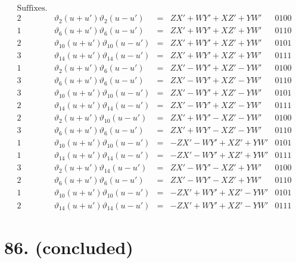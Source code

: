 \documentclass[11pt,a4paper]{article}
\newcommand{\uth}[1]{\vartheta_{#1}}
\begin{document}
\[
\begin{array}{ccccc}
\text{Suffixes.} & & & & \\
\hline
2 & \uth{2}(u+u')\uth{2}(u-u') &=& ZX' + WY' + XZ' + YW' & 0100 \\
1 & \uth{6}(u+u')\uth{6}(u-u') &=& ZX' + WY' + XZ' + YW' & 0110 \\
2 & \uth{10}(u+u')\uth{10}(u-u') &=& ZX' + WY' + XZ' + YW' & 0101 \\
3 & \uth{14}(u+u')\uth{14}(u-u') &=& ZX' + WY' + XZ' + YW' & 0111 \\
\hline
1 & \uth{2}(u+u')\uth{6}(u-u') &=& ZX' - WY' + XZ' - YW' & 0100 \\
3 & \uth{6}(u+u')\uth{6}(u-u') &=& ZX' - WY' + XZ' - YW' & 0110 \\
3 & \uth{10}(u+u')\uth{10}(u-u') &=& ZX' - WY' + XZ' - YW' & 0101 \\
2 & \uth{14}(u+u')\uth{14}(u-u') &=& ZX' - WY' + XZ' - YW' & 0111 \\
\hline
2 & \uth{2}(u+u')\uth{10}(u-u') &=& ZX' + WY' - XZ' - YW' & 0100 \\
3 & \uth{6}(u+u')\uth{6}(u-u') &=& ZX' + WY' - XZ' - YW' & 0110 \\
1 & \uth{10}(u+u')\uth{10}(u-u') &=& -ZX' - WY' + XZ' + YW' & 0101 \\
1 & \uth{14}(u+u')\uth{14}(u-u') &=& -ZX' - WY' + XZ' + YW' & 0111 \\
\hline
3 & \uth{2}(u+u')\uth{14}(u-u') &=& ZX' - WY' - XZ' + YW' & 0100 \\
2 & \uth{6}(u+u')\uth{6}(u-u') &=& ZX' - WY' - XZ' + YW' & 0110 \\
1 & \uth{10}(u+u')\uth{10}(u-u') &=& -ZX' + WY' + XZ' - YW' & 0101 \\
2 & \uth{14}(u+u')\uth{14}(u-u') &=& -ZX' + WY' + XZ' - YW' & 0111
\end{array}
\]

\newpage
\section*{86. (concluded)}
\label{sec:86conc}
\end{document}
